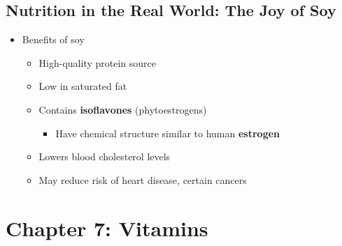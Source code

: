 \documentclass[12pt]{article}
\begin{document}
        \subsection{Nutrition in the Real World: The Joy of Soy}
                \begin{itemize}
                    \item Benefits of soy
                        \begin{itemize}
                            \item High-quality protein source
                            \item Low in saturated fat
                            \item Contains \textbf{isoflavones} (phytoestrogens)
                                \begin{itemize}
                                    \item Have chemical structure similar to human \textbf{estrogen}
                                \end{itemize}
                            \item Lowers blood cholesterol levels
                            \item May reduce risk of heart disease, certain cancers
                        \end{itemize}
                \end{itemize}

    \section{Chapter 7: Vitamins}
        
\end{document}
